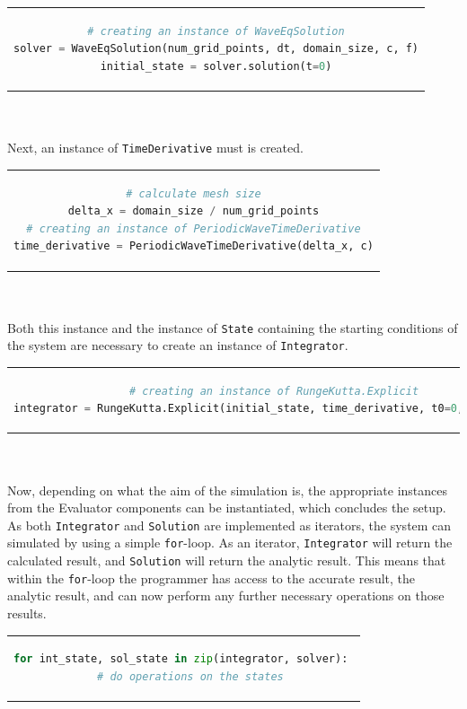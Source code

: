 \begin{tabular}{c}
\begin{lstlisting}[language=Python]
# creating an instance of WaveEqSolution
solver = WaveEqSolution(num_grid_points, dt, domain_size, c, f)
initial_state = solver.solution(t=0)
\end{lstlisting}
\end{tabular}
\\\\
Next, an instance of \texttt{TimeDerivative} must is created.\\
\begin{tabular}{c}
\begin{lstlisting}[language=Python]
# calculate mesh size
delta_x = domain_size / num_grid_points
# creating an instance of PeriodicWaveTimeDerivative
time_derivative = PeriodicWaveTimeDerivative(delta_x, c)
\end{lstlisting}
\end{tabular}\\\\
Both this instance and the instance of \texttt{State} containing the starting conditions of the system are necessary to create an instance of \texttt{Integrator}.\\
\begin{tabular}{c}
\begin{lstlisting}[language=Python]
# creating an instance of RungeKutta.Explicit
integrator = RungeKutta.Explicit(initial_state, time_derivative, t0=0,delta_t=dt)
\end{lstlisting}
\end{tabular}
\\\\
Now, depending on what the aim of the simulation is, the appropriate instances from the Evaluator components can be instantiated, which concludes the setup.
\\
As both \texttt{Integrator} and \texttt{Solution} are implemented as iterators, the system can simulated by using a simple \texttt{for}-loop.
As an iterator, \texttt{Integrator} will return the calculated result, and \texttt{Solution} will return the analytic result.
This means that within the \texttt{for}-loop the programmer has access to the accurate result, the analytic result, and can now perform any further necessary operations on those results.\\
\begin{tabular}{c}
\begin{lstlisting}[language=Python]
for int_state, sol_state in zip(integrator, solver): 
  # do operations on the states
\end{lstlisting}
\end{tabular}
